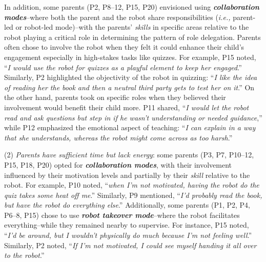 In addition, some parents (P2, P8–12, P15, P20) envisioned using \textit{\textbf{collaboration modes}}--where both the parent and the robot share responsibilities (\textit{i.e.,} parent-led or robot-led mode)--with the parents' \textit{skills} in specific areas relative to the robot playing a critical role in determining the pattern of role delegation. Parents often chose to involve the robot when they felt it could enhance their child's engagement especially in high-stakes tasks like quizzes. For example, P15 noted, ``\textit{I would use the robot for quizzes as a playful element to keep her engaged}.'' Similarly, P2 highlighted the objectivity of the robot in quizzing: ``\textit{I like the idea of reading her the book and then a neutral third party gets to test her on it}.'' On the other hand, parents took on specific roles when they believed their involvement would benefit their child more. P11 shared, ``\textit{I would let the robot read and ask questions but step in if he wasn't understanding or needed guidance},'' while P12 emphasized the emotional aspect of teaching: ``\textit{I can explain in a way that she understands, whereas the robot might come across as too harsh}.''

(2) \textit{Parents have sufficient time but lack energy}: some parents (P3, P7, P10--12, P15, P18, P20) opted for \textit{\textbf{collaboration modes}}, with their involvement influenced by their motivation levels and partially by their \textit{skill} relative to the robot. For example, P10 noted, ``\textit{when I'm not motivated, having the robot do the quiz takes some heat off me}.'' Similarly, P9 mentioned, ``\textit{I'd probably read the book, but have the robot do everything else}.'' Additionally, some parents (P1, P2, P4, P6–8, P15) chose to use \textit{\textbf{robot takeover mode}}--where the robot facilitates everything--while they remained nearby to supervise. For instance, P15 noted, ``\textit{I'd be around, but I wouldn't physically do much because I'm not feeling well}.'' Similarly, P2 noted, ``\textit{If I'm not motivated, I could see myself handing it all over to the robot}.''

